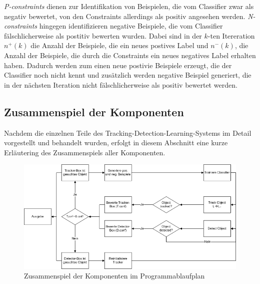 	\textit{P-constraints} dienen zur Identifikation von Beispielen, die vom Classifier zwar als negativ bewertet, von den Constraints allerdings als positiv angesehen werden. \textit{N-constraints} hingegen identifizieren negative Beispiele, die vom Classifier fälschlicherweise als postitiv bewerten wurden. Dabei sind in der $k$-ten Itereration $n^{+}(k)$ die Anzahl der Beispiele, die ein neues postives Label und $n^{-}(k)$, die Anzahl der Beispiele, die durch die Constraints ein neues negatives Label erhalten haben. Dadurch werden zum einen neue postivie Beispiele erzeugt, die der Classifier noch nicht kennt und zusätzlich werden negative Beispiel generiert, die in der nächsten Iteration nicht fälschlicherweise als positiv bewertet werden. 

	\subsection{Zusammenspiel der Komponenten}
	Nachdem die einzelnen Teile des Tracking-Detection-Learning-Systems im Detail vorgestellt und behandelt wurden, erfolgt in diesem Abschnitt eine kurze Erläutering des Zusammenspiels aller Komponenten.

	\begin{figure}
	\includegraphics[scale=0.5]{../pictures/PAP.png}

	\caption{Zusammenspiel der Komponenten im Programmablaufplan}
	\end{figure}

